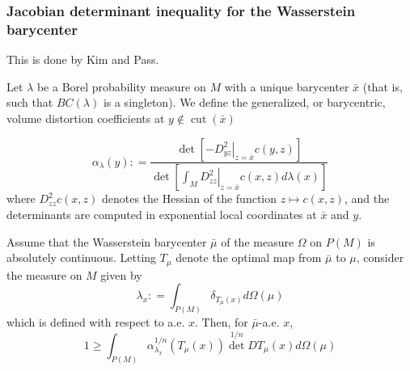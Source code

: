 \subsubsection{Jacobian determinant inequality for the Wasserstein barycenter}

This is done by Kim and Pass.
\begin{defn}
	Let \( \lambda \) be a Borel probability measure on \( M \) with a
	unique barycenter \( \bar { x } \) (that is, such that \( B C ( \lambda ) \) is a singleton). We define the generalized,
	or barycentric, volume distortion coefficients at \( y \notin \operatorname { cut } ( \bar { x } ) \)

	\[ \alpha _ { \lambda } ( y ) : = \frac { \operatorname { det } \left[ - \left. D _ { y z } ^ { 2 } \right| _ { z = \bar { x } } c ( y , z ) \right] } { \operatorname { det } \left[ \left. \int _ { M } D _ { z z } ^ { 2 } \right| _ { z = \bar { x } } c ( x , z ) d \lambda ( x ) \right] } \]
	where \( D _ { z z } ^ { 2 } c ( x , z ) \) denotes the Hessian of the function \( z \mapsto c ( x , z ) \), and the determinants
	are computed in exponential local coordinates at \( \bar { x } \) and \( y . \)
\end{defn}

\begin{thm}
	Assume that the Wasserstein barycenter \( \bar { \mu } \) of the measure \( \Omega \) on \( P ( M ) \) is absolutely continuous.
	Letting \( T _ { \mu } \) denote the optimal map from \( \bar { \mu } \) to \( \mu \), consider the measure on \( M \) given by
	\[ \lambda _ { x } : = \int _ { P ( M ) } \delta _ { T _ { \mu } ( x ) } d \Omega ( \mu ) \]
	which is defined with respect to a.e. $x$.
	Then, for \( \bar { \mu } \)-a.e. \(x\),
	\[ 1 \geq \int _ { P ( M ) } \alpha _ { \lambda _ { x } } ^ { 1 / n } \left( T _ { \mu } ( x ) \right) \operatorname { det } ^ { 1 / n } D T _ { \mu } ( x ) d \Omega ( \mu ) \]
\end{thm}


